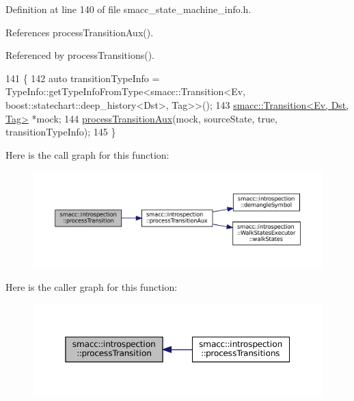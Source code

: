 Definition at line 140 of file smacc\+\_\+state\+\_\+machine\+\_\+info.\+h.



References process\+Transition\+Aux().



Referenced by process\+Transitions().


\begin{DoxyCode}
141 \{
142     \textcolor{keyword}{auto} transitionTypeInfo = TypeInfo::getTypeInfoFromType<smacc::Transition<Ev,
       boost::statechart::deep\_history<Dst>, Tag>>();
143     \hyperlink{classsmacc_1_1Transition}{smacc::Transition<Ev, Dst, Tag>} *mock;
144     \hyperlink{namespacesmacc_1_1introspection_a208cd71dc5579090d40b3d3b9efb28a6}{processTransitionAux}(mock, sourceState, \textcolor{keyword}{true}, transitionTypeInfo);
145 \}
\end{DoxyCode}
Here is the call graph for this function\+:
\nopagebreak
\begin{figure}[H]
\begin{center}
\leavevmode
\includegraphics[width=350pt]{namespacesmacc_1_1introspection_a91f7cda900e7002c923494db5afce63f_cgraph}
\end{center}
\end{figure}
Here is the caller graph for this function\+:
\nopagebreak
\begin{figure}[H]
\begin{center}
\leavevmode
\includegraphics[width=350pt]{namespacesmacc_1_1introspection_a91f7cda900e7002c923494db5afce63f_icgraph}
\end{center}
\end{figure}
\mbox{\label{namespacesmacc_1_1introspection_a4f5403936b7b501da0c6fa9f067e09fd}} 
